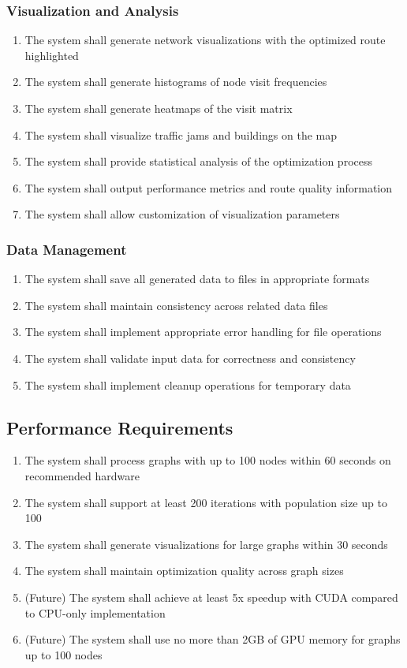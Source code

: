 \documentclass[conference]{IEEEtran}
\begin{document}
\subsubsection{Visualization and Analysis}
\begin{enumerate}
    \item The system shall generate network visualizations with the optimized route highlighted
    \item The system shall generate histograms of node visit frequencies
    \item The system shall generate heatmaps of the visit matrix
    \item The system shall visualize traffic jams and buildings on the map
    \item The system shall provide statistical analysis of the optimization process
    \item The system shall output performance metrics and route quality information
    \item The system shall allow customization of visualization parameters
\end{enumerate}

\subsubsection{Data Management}
\begin{enumerate}
    \item The system shall save all generated data to files in appropriate formats
    \item The system shall maintain consistency across related data files
    \item The system shall implement appropriate error handling for file operations
    \item The system shall validate input data for correctness and consistency
    \item The system shall implement cleanup operations for temporary data
\end{enumerate}

\subsection{Performance Requirements}
\begin{enumerate}
    \item The system shall process graphs with up to 100 nodes within 60 seconds on recommended hardware
    \item The system shall support at least 200 iterations with population size up to 100
    \item The system shall generate visualizations for large graphs within 30 seconds
    \item The system shall maintain optimization quality across graph sizes
    \item (Future) The system shall achieve at least 5x speedup with CUDA compared to CPU-only implementation
    \item (Future) The system shall use no more than 2GB of GPU memory for graphs up to 100 nodes
\end{enumerate}
\end{document}
